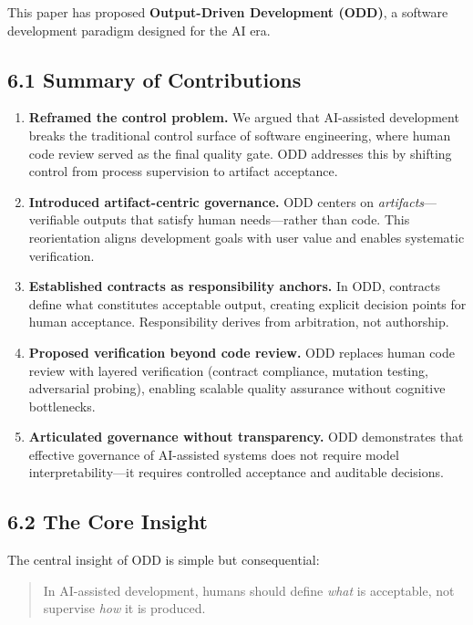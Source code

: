 \documentclass[
]{article}
\begin{document}
This paper has proposed \textbf{Output-Driven Development (ODD)}, a
software development paradigm designed for the AI era.

\hypertarget{61-summary-of-contributions}{%
\subsection{6.1 Summary of
Contributions}\label{61-summary-of-contributions}}

\begin{enumerate}
\def\labelenumi{\arabic{enumi}.}
\item
  \textbf{Reframed the control problem.} We argued that AI-assisted
  development breaks the traditional control surface of software
  engineering, where human code review served as the final quality gate.
  ODD addresses this by shifting control from process supervision to
  artifact acceptance.
\item
  \textbf{Introduced artifact-centric governance.} ODD centers on
  \emph{artifacts}---verifiable outputs that satisfy human
  needs---rather than code. This reorientation aligns development goals
  with user value and enables systematic verification.
\item
  \textbf{Established contracts as responsibility anchors.} In ODD,
  contracts define what constitutes acceptable output, creating explicit
  decision points for human acceptance. Responsibility derives from
  arbitration, not authorship.
\item
  \textbf{Proposed verification beyond code review.} ODD replaces human
  code review with layered verification (contract compliance, mutation
  testing, adversarial probing), enabling scalable quality assurance
  without cognitive bottlenecks.
\item
  \textbf{Articulated governance without transparency.} ODD demonstrates
  that effective governance of AI-assisted systems does not require
  model interpretability---it requires controlled acceptance and
  auditable decisions.
\end{enumerate}

\hypertarget{62-the-core-insight}{%
\subsection{6.2 The Core Insight}\label{62-the-core-insight}}

The central insight of ODD is simple but consequential:

\begin{quote}
In AI-assisted development, humans should define \emph{what} is
acceptable, not supervise \emph{how} it is produced.
\end{quote}
\end{document}
